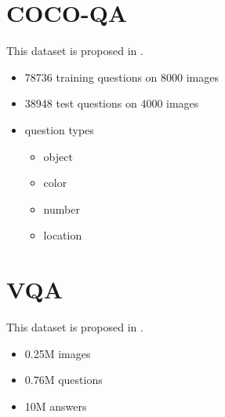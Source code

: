 \section{COCO-QA}
This dataset is proposed in \cite{coco-qa}.
\begin{itemize}
	\item 78736 training questions on 8000 images
	\item 38948 test questions on 4000 images
	\item question types
	\begin{itemize}
		\item object
		\item color
		\item number
		\item location
	\end{itemize}
\end{itemize}

\section{VQA}
This dataset is proposed in \cite{VQA}.

\begin{itemize}
	\item 0.25M images
	\item  0.76M questions
	\item  10M answers
\end{itemize}















